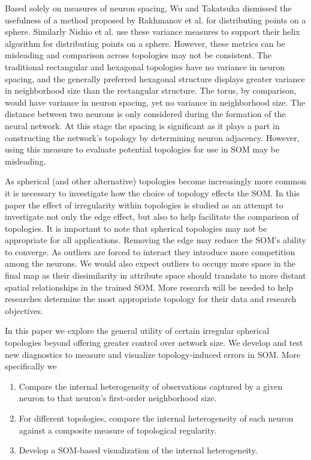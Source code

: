 Based solely on measures of neuron spacing, Wu and Takatsuka \cite{wu2005} dismissed the usefulness of a method
proposed by Rakhmanov et al. \cite{Rakhmanov94} for distributing points on a sphere.
Similarly Nishio et al.
\cite{Nishio:2006fk} use these variance measures to support their helix
algorithm for distributing points on a sphere.  However,
these metrics can be misleading and comparison across topologies may not be
consistent.  The traditional rectangular and hexagonal topologies have no
variance in neuron spacing, and the generally preferred hexagonal structure
displays greater variance in neighborhood size than the rectangular structure.
The torus, by comparison, would have variance in neuron spacing, yet no
variance in neighborhood size.  The distance between two neurons is only
considered during the formation of the neural network.  At this stage the
spacing is significant as it plays a part in constructing the network's
topology by determining neuron adjacency.  However, using this measure to
evaluate potential topologies for use in SOM may be misleading.

As spherical (and other alternative) topologies become
increasingly more common it is necessary to investigate how the choice of
topology effects the SOM.  In this paper the effect of irregularity within
topologies is studied as an attempt to investigate not only the edge effect,
but also to help facilitate the comparison of topologies.  It is important to
note that spherical topologies may not be appropriate for all applications.
Removing the edge may reduce the SOM's ability to converge.  As outliers are
forced to interact they introduce more competition among the neurons.  We
would also expect outliers to occupy more space in the final map as their
dissimilarity in attribute space should translate to more distant spatial
relationships in the trained SOM.  More research will be needed to help researches
determine the most appropriate topology for their data and research objectives.

In this paper we explore the general utility of certain irregular spherical
topologies beyond offering greater control over network size. We develop and
test new diagnostics to measure and visualize topology-induced errors in SOM.
More specifically we 

\begin{enumerate}
\item Compare the internal heterogeneity of observations captured by a given neuron to that neuron's first-order neighborhood size.
\item For different topologies, compare the internal heterogeneity of each neuron against a composite measure of topological regularity.
\item Develop a SOM-based visualization of the internal heterogeneity.
\end{enumerate}

